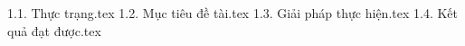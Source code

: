 {1.1. Thực trạng.tex}
{1.2. Mục tiêu đề tài.tex}
{1.3. Giải pháp thực hiện.tex}
{1.4. Kết quả đạt được.tex}

    
    

